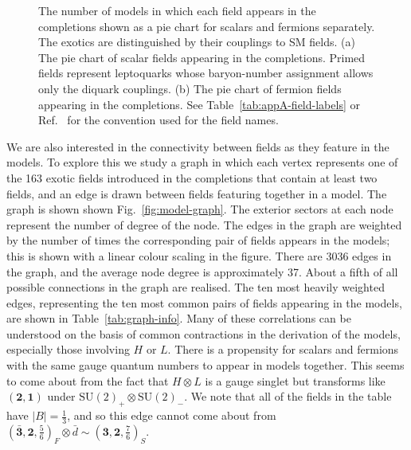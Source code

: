\begin{figure}
  \centering
  \caption[The number of models in which each field appears in the completions
  shown as a pie chart for scalars and fermions separately.]{The number of
    models in which each field appears in the completions shown as a pie chart
    for scalars and fermions separately. The exotics are distinguished by their
    couplings to SM fields. (a) The pie chart of scalar fields appearing in the
    completions. Primed fields represent leptoquarks whose baryon-number
    assignment allows only the diquark couplings. (b) The pie chart of fermion
    fields appearing in the completions. See Table~\ref{tab:appA-field-labels}
    or Ref.~\cite{deBlas:2017xtg} for the convention used for the field names.}
  \label{fig:field-piecharts}
\end{figure}

We are also interested in the connectivity between fields as they feature in the
models. To explore this we study a graph in which each vertex represents one of
the 163 exotic fields introduced in the completions that contain at least two
fields, and an edge is drawn between fields featuring together in a model. The
graph is shown shown Fig.~\ref{fig:model-graph}. The exterior sectors at each
node represent the number of degree of the node. The edges in the graph are
weighted by the number of times the corresponding pair of fields appears in the
models; this is shown with a linear colour scaling in the figure. There are 3036
edges in the graph, and the average node degree is approximately 37. About a
fifth of all possible connections in the graph are realised. The ten most
heavily weighted edges, representing the ten most common pairs of fields
appearing in the models, are shown in Table~\ref{tab:graph-info}. Many of these
correlations can be understood on the basis of common contractions in the
derivation of the models, especially those involving $H$ or $L$. There is a
propensity for scalars and fermions with the same gauge quantum numbers to
appear in models together. This seems to come about from the fact that
$H \otimes L$ is a gauge singlet but transforms like $(\mathbf{2}, \mathbf{1})$
under $\mathrm{SU}(2)_{+} \otimes \mathrm{SU}(2)_{-}$. We note that all of the
fields in the table have $|B| = \tfrac{1}{3}$, and so this edge cannot come
about from
$(\mathbf{\bar{3}}, \mathbf{2}, \tfrac{5}{6})_{F} \otimes \bar{d} \sim (\mathbf{3}, \mathbf{2}, \tfrac{7}{6})_{S}$.

